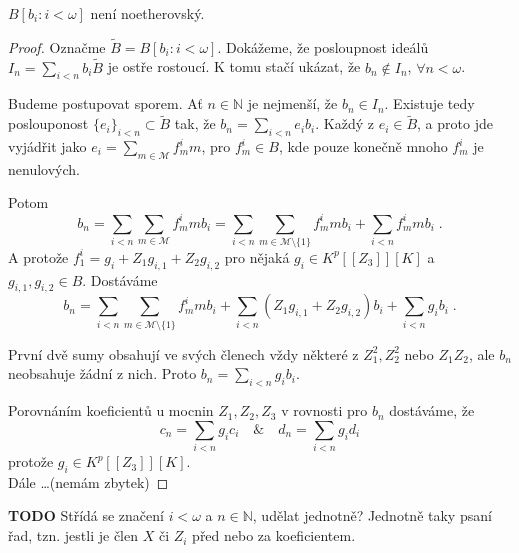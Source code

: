 \documentclass[11pt,a4paper]{article}
\newcommand\m[1]{\mathbb { #1 }} %
\newcommand\p[1]{\mathcal{ #1 }} %
\newcommand\N{\m N}
\theoremstyle{definition}
\theoremstyle{plain}
\begin{document}
\veta $B[b_i : i < \omega]$ není noetherovský.
\begin{proof}
	Označme $\tilde{B} = B[b_i : i < \omega]$. Dokážeme, že posloupnost
	ideálů $I_n = \sum_{i < n} b_i \tilde{B}$ je ostře rostoucí. K tomu
	stačí ukázat, že $b_n \notin I_n$, $\forall n < \omega$.

	Budeme postupovat sporem. Ať $n \in \N$ je nejmenší, že $b_n \in I_n$.
	Existuje tedy poslouponost $\{e_i\}_{i < n} \subset \tilde B$ tak, že
	$b_n = \sum_{i < n} e_i b_i$. Každý z $e_i \in \tilde B$, a proto jde
	vyjádřit jako $e_i = \sum_{m \in \p M} f^i_m m$, pro $f^i_m \in B$, kde
	pouze konečně mnoho $f^i_m$ je nenulových.

	Potom
	\[
	b_n = \sum_{i < n} \sum_{m \in \p M} f^i_m m b_i = \sum_{i < n} \sum_{m \in
	\p M \setminus \{1\}} f^i_m m b_i + \sum_{i < n} f^i_m m b_i \;.
	\]
	A protože $f^i_1 = g_i + Z_1 g_{i,1} + Z_2 g_{i,2}$ pro nějaká $g_i \in
	K^p[[Z_3]][K]$ a $g_{i,1}, g_{i,2} \in B$. Dostáváme
	\[
	b_n = \sum_{i < n} \sum_{m \in \p M \setminus \{1\}} f^i_m m b_i +
	\sum_{i<n} \left(Z_1 g_{i,1} + Z_2 g_{i,2}\right)b_i + \sum_{i<n} g_i b_i
	\;.
	\]

	První dvě sumy obsahují ve svých členech vždy některé z $Z_1^2, Z_2^2$ nebo
	$Z_1 Z_2$, ale $b_n$ neobsahuje žádní z nich. Proto $b_n = \sum_{i<n} g_i
	b_i$.

	Porovnáním koeficientů u mocnin $Z_1, Z_2, Z_3$ v rovnosti pro $b_n$
	dostáváme, že
	\[
	c_n = \sum_{i<n} g_i c_i \quad \& \quad d_n = \sum_{i<n} g_i d_i
	\]
	protože $g_i \in K^p[[Z_3]][K]$.
	\\

	Dále \dots (nemám zbytek)
\end{proof}

\textbf{TODO} Střídá se značení $i < \omega$ a $n \in \N$, udělat jednotně?
Jednotně taky psaní řad, tzn. jestli je člen $X$ či $Z_i$ před nebo za
koeficientem.
\end{document}
